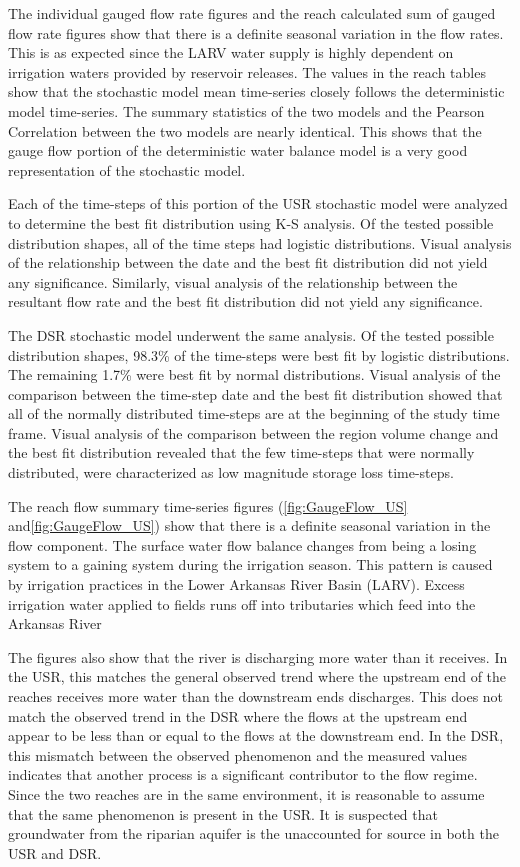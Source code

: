 \begin{linenumbers}
The individual gauged flow rate figures and the reach calculated sum of gauged flow rate figures show that there is a definite seasonal variation in the flow rates.  This is as expected since the LARV water supply is highly dependent on irrigation waters provided by reservoir releases.  The values in the reach tables show that the stochastic model mean time-series closely follows the deterministic model time-series.  The summary statistics of the two models and the Pearson Correlation between the two models are nearly identical.  This shows that the gauge flow portion of the deterministic water balance model is a very good representation of the stochastic model.  

Each of the time-steps of this portion of the USR stochastic model were analyzed to determine the best fit distribution using K-S analysis.  Of the tested possible distribution shapes, all of the time steps had logistic distributions.  Visual analysis of the relationship between the date and the best fit distribution did not yield any significance.  Similarly, visual analysis of the relationship between the resultant flow rate and the best fit distribution did not yield any significance. 

The DSR stochastic model underwent the same analysis.  Of the tested possible distribution shapes, 98.3\% of the time-steps were best fit by logistic distributions.  The remaining 1.7\% were best fit by normal distributions.  Visual analysis of the comparison between the time-step date and the best fit distribution showed that all of the normally distributed time-steps are at the beginning of the study time frame.   Visual analysis of the comparison between the region volume change and the best fit distribution revealed that the few time-steps that were normally distributed, were characterized as low magnitude storage loss time-steps.

The reach flow summary time-series figures (\ref{fig:GaugeFlow_US} and\ref{fig:GaugeFlow_US}) show that there is a definite seasonal variation in the flow component.  The surface water flow balance changes from being a losing system to a gaining system during the irrigation season.  This pattern is caused by irrigation practices in the Lower Arkansas River Basin (LARV).  Excess irrigation water applied to fields runs off into tributaries which feed into the Arkansas River

The figures also show that the river is discharging more water than it receives.  In the USR, this matches the general observed trend where the upstream end of the reaches receives more water than the downstream ends discharges.  This does not match the observed trend in the DSR where the flows at the upstream end appear to be less than or equal to the flows at the downstream end.  In the DSR, this mismatch between the observed phenomenon and the measured values indicates that another process is a significant contributor to the flow regime.  Since the two reaches are in the same environment, it is reasonable to assume that the same phenomenon is present in the USR.  It is suspected that groundwater from the riparian aquifer is the unaccounted for source in both the USR and DSR.


\end{linenumbers}
